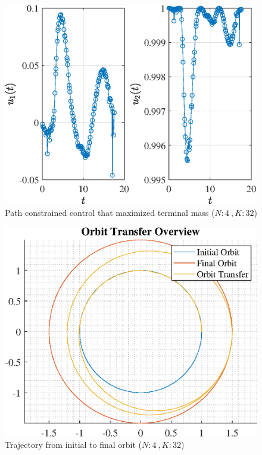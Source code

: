 \documentclass[]{article}
\begin{document}
\begin{figure}
	\centering
	\includegraphics[scale=0.75]{path_N4_K32_C3_mf.eps}
	\caption{Path constrained control that maximized terminal mass (\(N:4\ , K:32\))}
	\label{fig:path_N4_K32_C3_mf}
\end{figure}
\begin{figure}
	\centering
	\includegraphics[scale=0.75]{orbit_N4_K32_C3_mf.eps}
	\caption{Trajectory from initial to final orbit (\(N:4\ , K:32\))}
	\label{fig:orbit_N4_K32_C3_mf}
\end{figure}
\end{document}
